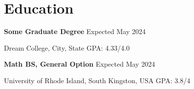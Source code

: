 \renewcommand{\subsection}[3]{
    \noindent\textbf{#1}  \emph{#2} \hfill #3 \break
}

\section{Education}
\subsection{Some Graduate Degree}{}{Expected May 2024}
Dream College, City, State \hfill GPA: 4.33/4.0

\subsection{Math BS, General Option}{}{Expected May 2024}
University of Rhode Island, South Kingston, USA \hfill GPA: 3.8/4

\vspace{0.2em}
